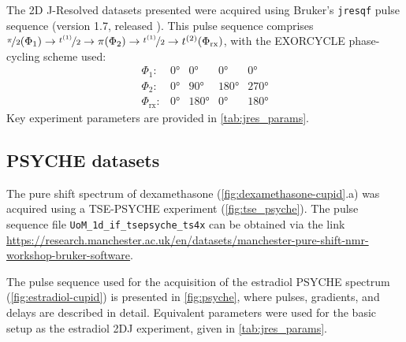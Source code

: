 The 2D J-Resolved datasets presented were acquired using Bruker's
\texttt{jresqf} pulse sequence (version 1.7, released
). This pulse sequence comprises
 $\nicefrac{\pi}{2}(\Phi_1) \rightarrow \nicefrac{t^{(1)}}{2} \rightarrow
\pi(\Phi_{2}) \rightarrow \nicefrac{t^{(1)}}{2} \rightarrow t^{(2)}(\Phi_{\text{rx}})$, with
the EXORCYCLE phase-cycling scheme used\cite[Section 11.6]{Keeler2010}:
\begin{equation*}
    \begin{array}{lllll}
        \Phi_{1}: & \ang{0} & \ang{0} & \ang{0} & \ang{0} \\
        \Phi_{2}: & \ang{0} & \ang{90} & \ang{180} & \ang{270} \\
        \Phi_{\text{rx}}: & \ang{0} & \ang{180} & \ang{0} & \ang{180}
    \end{array}
\end{equation*}
Key experiment parameters are provided in \cref{tab:jres_params}.


\subsection{\acs{PSYCHE} datasets}
The pure shift spectrum of dexamethasone (\cref{fig:dexamethasone-cupid}.a) was
acquired using a \ac{TSE-PSYCHE}
experiment (\cref{fig:tse_psyche}). The pulse sequence file
\texttt{UoM\_1d\_if\_tsepsyche\_ts4x} can be obtained via the link
\url{https://research.manchester.ac.uk/en/datasets/manchester-pure-shift-nmr-workshop-bruker-software}.

The pulse sequence used for the acquisition of the estradiol \ac{PSYCHE}
spectrum (\cref{fig:estradiol-cupid}) is presented in
\cref{fig:psyche}, where
pulses, gradients, and delays are described in detail. Equivalent parameters
were used for the basic setup as the estradiol 2DJ experiment, given in
\cref{tab:jres_params}.

